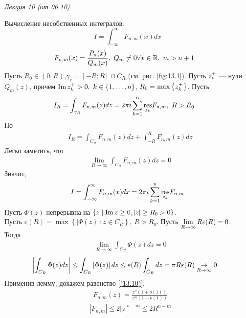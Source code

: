 \begin{flushright}
    \textit{Лекция 10 (от 06.10)}
\end{flushright}
\Example
Вычисление несобственных интегралов.
\begin{equation}\label{(13.9)}
    I = \int_{-\infty}^{\infty}F_{n,m}(x)dx
\end{equation}
\begin{align*}
  & F_{n,m}(x) = \frac{P_n(x)}{Q_m(x)}, \ Q_m \neq 0 \forall x \in \mathbb{R}, \ m > n+1
\end{align*}
Пусть $R_0 \in (0, R)$,$\gamma_r = [-R;R]\cap C_R$ (см. рис. \ref{fig:13.1}).
Пусть $z_k^+$~--- нули $Q_m(z)$, причем $\mathrm{Im}\, z_k^+ > 0, \ k \in \{1, \dots,
n\}$, $R_0 = \max \left\{{z_k^+}\right\}$. Пусть
\begin{align*}
  & I_R = \int_{\gamma_R}F_{n,m}(z)dz = 2 \pi i \sum_{k=1}^n\underset{z_k}{\mathrm{res}}F_{n,m}, \ R > R_0
\end{align*}
Но
\begin{align*}
  & I_R = \int_{C_R}F_{n,m}(z)dz + \int_{-R}^RF_{n,m}(z)dz
\end{align*}
Легко заметить, что
\begin{align*}
  & \lim_{R \to \infty} \int_{C_R}F_{n,m}(z)dz = 0
\end{align*}
Значит,
\begin{equation}\label{(13.10)}
    I = \int_{-\infty}^{\infty}F_{n,m}(x)dx = 2 \pi i \sum_{k=1}^n \underset{z_k}{\mathrm{res}} F_{n,m}
\end{equation}
\lemma
Пусть $\Phi(z)$ непрерывна на $\left\{{z \mid \mathrm{Im}\, z \geq 0, \left|{z}\right| \geq R_0 >
  0}\right\}$.
\\
Пусть $\varepsilon(R) = \max \left\{ \left| \Phi(z) \right| : z \in C_R\right\},
\ R > R_0$. Пусть $\displaystyle \lim_{R \to \infty}R\varepsilon(R) = 0$.
\\
Тогда
\begin{align*}
  & \lim_{R \to \infty }\int_{C_R}\Phi(z)dz = 0
\end{align*}
\pr
\begin{align*}
  & \left| \int_{C_R}\Phi(z)dz \right|\leq \int_{C_R}\left| \Phi(z) \right| dz \leq \varepsilon(R) \int_{C_R}dz = \pi R \varepsilon(R) \underset{R \to \infty}{\to} 0
\end{align*}
Применив лемму, докажем равенство \eqref{(13.10)}.
\begin{align*}
  & F_{n,m}(z) = \frac{z^n(1+o(1))}{z^m(1+o(1))}
\end{align*}
\begin{align*}
  & \left| F_{n,m} \right| \leq 2 \left| z \right|^{n-m} \leq 2 R^{n-m}
\end{align*}
